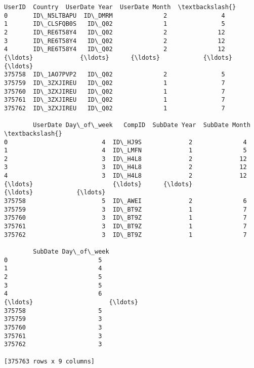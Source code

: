 \documentclass{report}
\makeatletter
\newcommand{\boxspacing}{\kern\kvtcb@left@rule\kern\kvtcb@boxsep}
\newcommand{\prompt}[4]{
        \ttfamily\llap{{\color{#2}[#3]:\hspace{3pt}#4}}\vspace{-\baselineskip}
    }
\makeatother
\begin{document}
            \begin{tcolorbox}[breakable, size=fbox, boxrule=.5pt, pad at break*=1mm, opacityfill=0]
\prompt{Out}{outcolor}{8}{\boxspacing}
\begin{Verbatim}[commandchars=\\\{\}]
             UserID  Country  UserDate Year  UserDate Month  \textbackslash{}
0       ID\_N5LTBAPU  ID\_DMRM              2               4
1       ID\_CLSFQB0S   ID\_Q02              1               5
2       ID\_RE6T58Y4   ID\_Q02              2              12
3       ID\_RE6T58Y4   ID\_Q02              2              12
4       ID\_RE6T58Y4   ID\_Q02              2              12
{\ldots}             {\ldots}      {\ldots}            {\ldots}             {\ldots}
375758  ID\_1AO7PVP2   ID\_Q02              2               5
375759  ID\_3ZXJIREU   ID\_Q02              1               7
375760  ID\_3ZXJIREU   ID\_Q02              1               7
375761  ID\_3ZXJIREU   ID\_Q02              1               7
375762  ID\_3ZXJIREU   ID\_Q02              1               7

        UserDate Day\_of\_week   CompID  SubDate Year  SubDate Month  \textbackslash{}
0                          4  ID\_HJ9S             2              4
1                          4  ID\_LMFN             1              5
2                          3  ID\_H4L8             2             12
3                          3  ID\_H4L8             2             12
4                          3  ID\_H4L8             2             12
{\ldots}                      {\ldots}      {\ldots}           {\ldots}            {\ldots}
375758                     5  ID\_AWEI             2              6
375759                     3  ID\_BT9Z             1              7
375760                     3  ID\_BT9Z             1              7
375761                     3  ID\_BT9Z             1              7
375762                     3  ID\_BT9Z             1              7

        SubDate Day\_of\_week
0                         5
1                         4
2                         5
3                         5
4                         6
{\ldots}                     {\ldots}
375758                    5
375759                    3
375760                    3
375761                    3
375762                    3

[375763 rows x 9 columns]
\end{Verbatim}
\end{tcolorbox}
        
\end{document}

